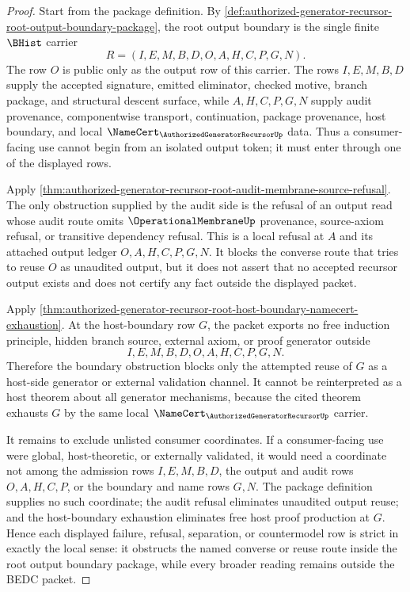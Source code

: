 \begin{proof}
Start from the package definition. By \autoref{def:authorized-generator-recursor-root-output-boundary-package}, the root output boundary is the single finite $\BHist$ carrier
$$
R=(I,E,M,B,D,O,A,H,C,P,G,N).
$$
The row $O$ is public only as the output row of this carrier. The rows $I,E,M,B,D$ supply the accepted signature, emitted eliminator, checked motive, branch package, and structural descent surface, while $A,H,C,P,G,N$ supply audit provenance, componentwise transport, continuation, package provenance, host boundary, and local $\NameCert_{\AuthorizedGeneratorRecursorUp}$ data. Thus a consumer-facing use cannot begin from an isolated output token; it must enter through one of the displayed rows.

Apply \autoref{thm:authorized-generator-recursor-root-audit-membrane-source-refusal}. The only obstruction supplied by the audit side is the refusal of an output read whose audit route omits $\OperationalMembraneUp$ provenance, source-axiom refusal, or transitive dependency refusal. This is a local refusal at $A$ and its attached output ledger $O,A,H,C,P,G,N$. It blocks the converse route that tries to reuse $O$ as unaudited output, but it does not assert that no accepted recursor output exists and does not certify any fact outside the displayed packet.

Apply \autoref{thm:authorized-generator-recursor-root-host-boundary-namecert-exhaustion}. At the host-boundary row $G$, the packet exports no free induction principle, hidden branch source, external axiom, or proof generator outside
$$
I,E,M,B,D,O,A,H,C,P,G,N.
$$
Therefore the boundary obstruction blocks only the attempted reuse of $G$ as a host-side generator or external validation channel. It cannot be reinterpreted as a host theorem about all generator mechanisms, because the cited theorem exhausts $G$ by the same local $\NameCert_{\AuthorizedGeneratorRecursorUp}$ carrier.

It remains to exclude unlisted consumer coordinates. If a consumer-facing use were global, host-theoretic, or externally validated, it would need a coordinate not among the admission rows $I,E,M,B,D$, the output and audit rows $O,A,H,C,P$, or the boundary and name rows $G,N$. The package definition supplies no such coordinate; the audit refusal eliminates unaudited output reuse; and the host-boundary exhaustion eliminates free host proof production at $G$. Hence each displayed failure, refusal, separation, or countermodel row is strict in exactly the local sense: it obstructs the named converse or reuse route inside the root output boundary package, while every broader reading remains outside the BEDC packet.
\end{proof}
